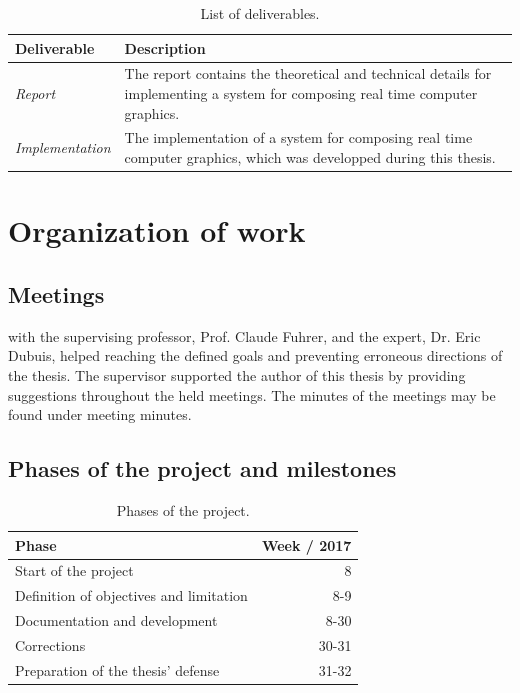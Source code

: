 \documentclass[%
    a4paper,
    nobib,   %
    openany  %
]{tufte-book}
\begin{document}
\begin{table}[h]
  \caption{List of deliverables.}
  \begin{tabularx}{\textwidth}{lX}
    \toprule
    \textbf{Deliverable} & \textbf{Description} \\
    \midrule
    \textit{Report} & The report contains the theoretical and technical details for
    implementing a system for composing real time computer graphics. \\
    \midrule
    \textit{Implementation} & The implementation of a system for composing real time
    computer graphics, which was developped during this thesis. \\
    \bottomrule
  \end{tabularx}
\end{table}

\newpage{}

\section{Organization of work}
\label{sec:organization-of-work}

\subsection{Meetings}
\label{subsec:meetings}

 with the supervising professor, Prof. Claude
Fuhrer, and the expert, Dr. Eric Dubuis, helped reaching the defined goals and
preventing erroneous directions of the thesis. The supervisor supported the
author of this thesis by providing suggestions throughout the held meetings.
The minutes of the meetings may be found under meeting minutes.

\subsection{Phases of the project and milestones}
\label{subsec:project-phases-milestones}

\begin{table}[h]
  \caption{Phases of the project.}
  \begin{tabularx}{\textwidth}{Xr}
    \toprule
    \textbf{Phase}   & \textbf{Week / 2017} \\
    \midrule
    Start of the project & 8 \\
    Definition of objectives and limitation & 8-9 \\
    Documentation and development & 8-30 \\
    Corrections & 30-31 \\
    Preparation of the thesis' defense & 31-32 \\
    \bottomrule
  \end{tabularx}
\end{table}
\end{document}
